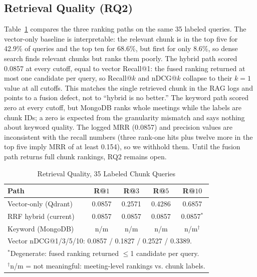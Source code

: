 \documentclass[conference]{IEEEtran}
\begin{document}
\subsection{Retrieval Quality (RQ2)}
\label{sec:retrieval}
Table~\ref{tab:retrieval} compares the three ranking paths on the same 35 labeled queries. The vector-only baseline is interpretable: the relevant chunk is in the top five for 42.9\% of queries and the top ten for 68.6\%, but first for only 8.6\%, so dense search finds relevant chunks but ranks them poorly. The hybrid path scored 0.0857 at every cutoff, equal to vector Recall@1: the fused ranking returned at most one candidate per query, so Recall@$k$ and nDCG@$k$ collapse to their $k{=}1$ value at all cutoffs. This matches the single retrieved chunk in the RAG logs and points to a fusion defect, not to ``hybrid is no better.'' The keyword path scored zero at every cutoff, but MongoDB ranks whole meetings while the labels are chunk IDs; a zero is expected from the granularity mismatch and says nothing about keyword quality. The logged MRR (0.0857) and precision values are inconsistent with the recall numbers (three rank-one hits plus twelve more in the top five imply MRR of at least 0.154), so we withhold them. Until the fusion path returns full chunk rankings, RQ2 remains open.

\begin{table}[!t]
\caption{Retrieval Quality, 35 Labeled Chunk Queries}
\label{tab:retrieval}
\centering
\footnotesize
\setlength{\tabcolsep}{3pt}
\begin{tabular}{lcccc}
\toprule
\textbf{Path} & \textbf{R@$1$} & \textbf{R@$3$} & \textbf{R@$5$} & \textbf{R@$10$}\\
\midrule
Vector-only (Qdrant) & 0.0857 & 0.2571 & 0.4286 & 0.6857\\
RRF hybrid (current) & 0.0857 & 0.0857 & 0.0857 & 0.0857$^{*}$\\
Keyword (MongoDB) & n/m & n/m & n/m & n/m$^{\dagger}$\\
\midrule
\multicolumn{5}{l}{\scriptsize Vector nDCG@1/3/5/10: 0.0857 / 0.1827 / 0.2527 / 0.3389.}\\
\multicolumn{5}{l}{\scriptsize $^{*}$Degenerate: fused ranking returned $\le$1 candidate per query.}\\
\multicolumn{5}{l}{\scriptsize $^{\dagger}$n/m = not meaningful: meeting-level rankings vs. chunk labels.}\\
\bottomrule
\end{tabular}
\end{table}
\end{document}
